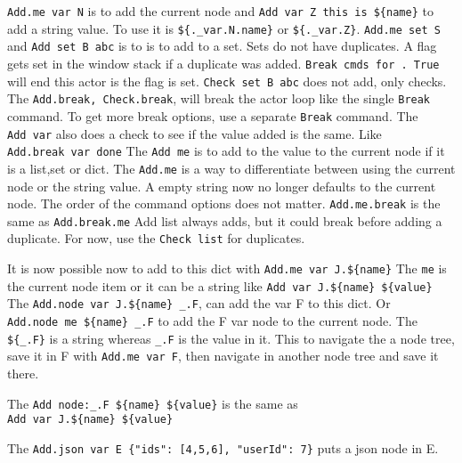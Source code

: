 \texttt{Add.me\ var\ N} is to add the current node and
\texttt{Add\ var\ Z\ this\ is\ \$\{name\}} to add a string value. To use
it is \texttt{\$\{.\_var.N.name\}} or \texttt{\$\{.\_var.Z\}}.
\texttt{Add.me\ set\ S} and \texttt{Add\ set\ B\ abc} is to is to add to
a set. Sets do not have duplicates. A flag gets set in the window stack
if a duplicate was added. \texttt{Break\ cmds\ for\ .\ True} will end
this actor is the flag is set. \texttt{Check\ set\ B\ abc} does not add,
only checks. The \texttt{Add.break,\ Check.break}, will break the actor
loop like the single \texttt{Break} command. To get more break options,
use a separate \texttt{Break} command. The \texttt{Add\ var} also does a
check to see if the value added is the same. Like
\texttt{Add.break\ var\ done} The \texttt{Add\ me} is to add to the
value to the current node if it is a list,set or dict. The
\texttt{Add.me} is a way to differentiate between using the current node
or the string value. A empty string now no longer defaults to the
current node. The order of the command options does not matter.
\texttt{Add.me.break} is the same as \texttt{Add.break.me} Add list
always adds, but it could break before adding a duplicate. For now, use
the \texttt{Check\ list} for duplicates.

It is now possible now to add to this dict with
\texttt{Add.me\ var\ J.\$\{name\}} The \texttt{me} is the current node
item or it can be a string like
\texttt{Add\ var\ J.\$\{name\}\ \$\{value\}} The
\texttt{Add.node\ var\ J.\$\{name\}\ \_.F}, can add the var F to this
dict. Or \texttt{Add.node\ me\ \$\{name\}\ \_.F} to add the F var node
to the current node. The \texttt{\$\{\_.F\}} is a string whereas
\texttt{\_.F} is the value in it. This to navigate the a node tree, save
it in F with \texttt{Add.me\ var\ F}, then navigate in another node tree
and save it there.

The \texttt{Add\ node:\_.F\ \$\{name\}\ \$\{value\}} is the same as
\texttt{Add\ var\ J.\$\{name\}\ \$\{value\}}

The \texttt{Add.json\ var\ E\ \{"ids":\ {[}4,5,6{]},\ "userId":\ 7\}}
puts a json node in E.
